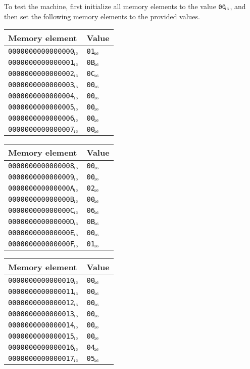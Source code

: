 \documentclass[a4paper,11pt]{article}
\newcommand{\num}[1]{\texttt{#1}\xspace}
\newcommand{\hex}[1]{\num{#1}$_{\textup{\tiny\hskip-1ex 16}}$\xspace}
\begin{document}
To test the machine, first initialize all memory elements to the value \hex{00}, and then set the following memory elements to the provided values.

\begin{center}
  \begin{tabular}{@{}ll@{}}
    \hline
    Memory element         & Value \\
    \hline
    \hex{0000000000000000} & \hex{01} \\
    \hex{0000000000000001} & \hex{0B} \\
    \hex{0000000000000002} & \hex{0C} \\
    \hex{0000000000000003} & \hex{00} \\
    \hex{0000000000000004} & \hex{00} \\
    \hex{0000000000000005} & \hex{00} \\
    \hex{0000000000000006} & \hex{00} \\
    \hex{0000000000000007} & \hex{00} \\
    \hline
  \end{tabular}
  \hfill
  \begin{tabular}{@{}ll@{}}
    \hline
    Memory element         & Value \\
    \hline
    \hex{0000000000000008} & \hex{00} \\
    \hex{0000000000000009} & \hex{00} \\
    \hex{000000000000000A} & \hex{02} \\
    \hex{000000000000000B} & \hex{00} \\
    \hex{000000000000000C} & \hex{06} \\
    \hex{000000000000000D} & \hex{0B} \\
    \hex{000000000000000E} & \hex{00} \\
    \hex{000000000000000F} & \hex{01} \\
    \hline
  \end{tabular}
  \hfill
  \begin{tabular}{@{}ll@{}}
    \hline
    Memory element         & Value \\
    \hline
    \hex{0000000000000010} & \hex{00} \\
    \hex{0000000000000011} & \hex{00} \\
    \hex{0000000000000012} & \hex{00} \\
    \hex{0000000000000013} & \hex{00} \\
    \hex{0000000000000014} & \hex{00} \\
    \hex{0000000000000015} & \hex{00} \\
    \hex{0000000000000016} & \hex{04} \\
    \hex{0000000000000017} & \hex{05} \\
    \hline
  \end{tabular}
\end{center}
\end{document}
